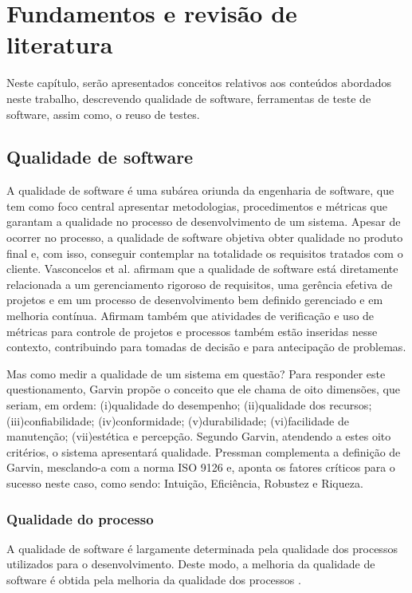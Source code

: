 \documentclass[tg]{mdtufsm}
\begin{document}
\chapter{Fundamentos e revisão de literatura}

Neste capítulo, serão apresentados conceitos relativos aos conteúdos abordados neste trabalho, descrevendo qualidade de software, ferramentas de teste de software, assim como, o reuso de testes.

\section{Qualidade de software}

A qualidade de software é uma subárea oriunda da engenharia de software, que tem como foco central apresentar metodologias,
procedimentos e métricas que garantam a qualidade no processo de desenvolvimento de um sistema. Apesar de ocorrer no processo, a qualidade de software
objetiva obter qualidade no produto final e, com isso, conseguir contemplar na totalidade os requisitos tratados com o cliente.
Vasconcelos et al. \citeyearpar{de2006introduccao} afirmam que a qualidade de software está diretamente relacionada a um gerenciamento
rigoroso de requisitos, uma gerência efetiva de projetos e em um processo de desenvolvimento bem definido gerenciado e em melhoria contínua. Afirmam também que atividades de verificação e uso de métricas para controle de projetos e processos também estão inseridas nesse contexto, contribuindo para tomadas de
decisão e para antecipação de problemas.

Mas como medir a qualidade de um sistema em questão? Para responder este questionamento, Garvin \citeyearpar{garvin1987competing} propõe o conceito que ele chama de
oito dimensões, que seriam, em ordem: (i)qualidade do desempenho; (ii)qualidade dos recursos; (iii)confiabilidade; (iv)conformidade; (v)durabilidade; (vi)facilidade de manutenção; (vii)estética e percepção. Segundo Garvin, atendendo a estes oito critérios, o sistema apresentará qualidade.
Pressman \citeyearpar{pressman2011engenharia} complementa a definição de Garvin, mesclando-a com a norma ISO 9126 e, aponta os fatores
críticos para o sucesso neste caso, como sendo: Intuição, Eficiência, Robustez e Riqueza.

\subsection{Qualidade do processo}
A qualidade de software é largamente determinada pela qualidade dos processos utilizados para o desenvolvimento. Deste modo, a melhoria
da qualidade de software é obtida pela melhoria da qualidade dos processos \cite{koscianski2007qualidade}.
\end{document}
